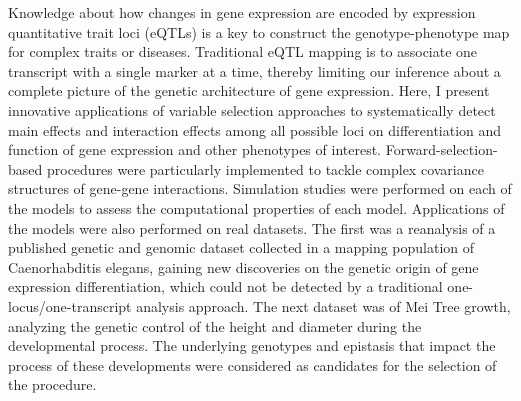 Knowledge about how changes in gene expression are encoded by expression quantitative trait loci (eQTLs) is a key to construct the genotype-phenotype map for complex traits or diseases. Traditional eQTL mapping is to associate one transcript with a single marker at a time, thereby limiting our inference about a complete picture of the genetic architecture of gene expression. Here, I present innovative applications of variable selection approaches to systematically detect main effects and interaction effects among all possible loci on differentiation and function of gene expression and other phenotypes of interest. Forward-selection-based procedures were particularly implemented to tackle complex covariance structures of gene-gene interactions. Simulation studies were performed on each of the models to assess the computational properties of each model.  Applications of the models were also performed on real datasets.  The first was a reanalysis of a published genetic and genomic dataset collected in a mapping population of Caenorhabditis elegans, gaining new discoveries on the genetic origin of gene expression differentiation, which could not be detected by a traditional one-locus/one-transcript analysis approach.  The next dataset was of Mei Tree growth, analyzing the genetic control of the height and diameter during the developmental process.  The underlying genotypes and epistasis that impact the process of these developments were considered as candidates for the selection of the procedure.
